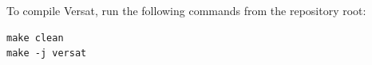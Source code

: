 %

To compile Versat, run the following commands from the repository root:

\begin{verbatim}
make clean
make -j versat
\end{verbatim}
